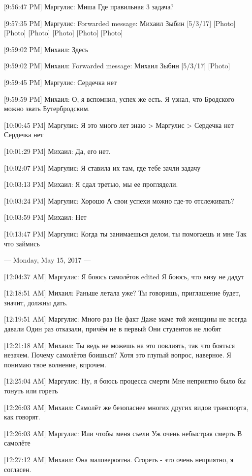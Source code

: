 \documentclass{article}
\begin{document}
[9:56:47 PM] Маргулис:
Миша
 Где правильная 3 задача?

[9:57:35 PM] Маргулис:
Forwarded message: Михаил Зыбин [5/3/17] 
[Photo]
[Photo]
[Photo]
[Photo]
[Photo]
[Photo]

[9:59:02 PM] Михаил:
Здесь

[9:59:02 PM] Михаил:
Forwarded message: Михаил Зыбин [5/3/17] 
[Photo]

[9:59:45 PM] Маргулис:
Сердечка нет

[9:59:59 PM] Михаил:
О, я вспомнил, успех же есть. Я узнал, что Бродского можно звать Бутербродским.

[10:00:45 PM] Маргулис:
Я это много лет знаю
> Маргулис
> Сердечка нет
Сердечка нет

[10:01:29 PM] Михаил:
Да, его нет.

[10:02:07 PM] Маргулис:
Я ставила их там, где тебе зачли задачу

[10:03:13 PM] Михаил:
Я сдал третью, мы ее проглядели.

[10:03:24 PM] Маргулис:
Хорошо
 А свои успехи можно где-то отслеживать?

[10:03:59 PM] Михаил:
Нет

[10:13:47 PM] Маргулис:
Когда ты занимаешься делом, ты помогаешь и мне
 Так что займись

--- Monday, May 15, 2017 ---

[12:04:37 AM] Маргулис:
Я боюсь самолётов
edited 
Я боюсь, что визу не дадут

[12:18:51 AM] Михаил:
Раньше летала уже?
 Ты говоришь, приглашение будет, значит, должны дать.

[12:19:51 AM] Маргулис:
Много раз
 Не факт
 Даже маме той женщины не всегда давали
 Один раз отказали, причём не в первый
 Они студентов не любят

[12:21:18 AM] Михаил:
Ты ведь не можешь на это повлиять, так что бояться незачем.
 Почему самолётов боишься? Хотя это глупый вопрос, наверное.
 Я понимаю твое волнение, впрочем.

[12:25:04 AM] Маргулис:
Ну, я боюсь процесса смерти
 Мне неприятно было бы тонуть или гореть

[12:26:03 AM] Михаил:
Самолёт же безопаснее многих других видов транспорта, как говорят.

[12:26:03 AM] Маргулис:
Или чтобы меня съели
 Уж очень небыстрая смерть
 В самолёте

[12:27:12 AM] Михаил:
Она маловероятна.
 Сгореть - это очень неприятно, я согласен.
\end{document}
